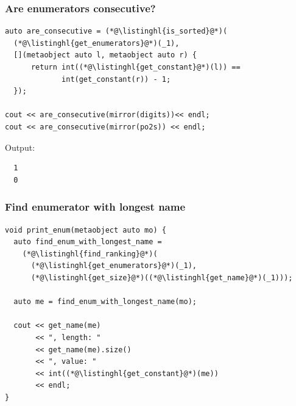 \documentclass[compress,table,xcolor=table]{beamer}
\begin{document}
\begin{frame}[fragile]
  \frametitle{Are enumerators consecutive?}
  \begin{lstlisting}[language=c++2x,basicstyle=\small\ttfamily]
auto are_consecutive = (*@\listinghl{is_sorted}@*)(
  (*@\listinghl{get_enumerators}@*)(_1),
  [](metaobject auto l, metaobject auto r) {
      return int((*@\listinghl{get_constant}@*)(l)) ==
             int(get_constant(r)) - 1;
  });

cout << are_consecutive(mirror(digits))<< endl;
cout << are_consecutive(mirror(po2s)) << endl;
  \end{lstlisting}
  Output:
  \begin{verbatim}
  1
  0
  \end{verbatim}
\end{frame}
\begin{frame}[fragile]
  \frametitle{Find enumerator with longest name}
  \begin{lstlisting}[language=c++2x,basicstyle=\footnotesize\ttfamily]
void print_enum(metaobject auto mo) {
  auto find_enum_with_longest_name =
    (*@\listinghl{find_ranking}@*)(
      (*@\listinghl{get_enumerators}@*)(_1),
      (*@\listinghl{get_size}@*)((*@\listinghl{get_name}@*)(_1)));

  auto me = find_enum_with_longest_name(mo);

  cout << get_name(me)
       << ", length: "
       << get_name(me).size()
       << ", value: "
       << int((*@\listinghl{get_constant}@*)(me))
       << endl;
}
  \end{lstlisting}
\end{frame}
\end{document}
